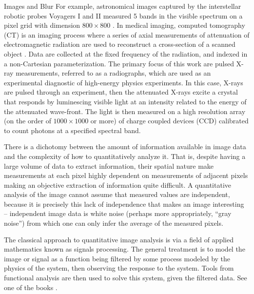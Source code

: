 \begin{chapter}{Images and Blur}
  For example, astronomical images captured by the interstellar robotic probes Voyagers I and II measured 5 bands in the visible spectrum on a pixel grid with dimension $800 \times 800$ \citep{voyager}.
  In medical imaging, computed tomography (CT) is an imaging process where a series of axial measurements of attenuation of electromagnetic radiation are used to reconstruct a cross-section of a scanned object \citep{epstein2008}.
  Data are collected at the fixed frequency of the radiation, and indexed in a non-Cartesian parameterization.
  The primary focus of this work are pulsed X-ray measurements, referred to as a radiographs, which are used as an experimental diagnostic of high-energy physics experiments.  
  In this case, X-rays are pulsed through an experiment, then the attenuated X-rays excite a crystal that responds by luminescing visible light at an intensity related to the energy of the attenuated wave-front.  
  The light is then measured on a high resolution array (on the order of $1000\times1000$ or more) of charge coupled devices (CCD) calibrated to count photons at a specified spectral band.

There is a dichotomy between the amount of information available in image data and the complexity of how to quantitatively analyze it.
That is, despite having a large volume of data to extract information, their spatial nature make measurements at each pixel highly dependent on measurements of adjacent pixels making an objective extraction of information quite difficult.
  A quantitative analysis of the image cannot assume that measured values are independent, because it is precisely this lack of independence that makes an image interesting -- independent image data is white noise (perhaps more appropriately, ``gray noise'') from which one can only infer the average of the measured pixels.

The classical approach to quantitative image analysis is via a field of applied mathematics known as signals processing.
The general treatment is to model the image or signal as a function being filtered by some process modeled by the physics of the system, then observing the response to the system.
Tools from functional analysis are then used to solve this system, given the filtered data.
See one of the books \citep{vogel2002,epstein2008}.


\end{chapter}
